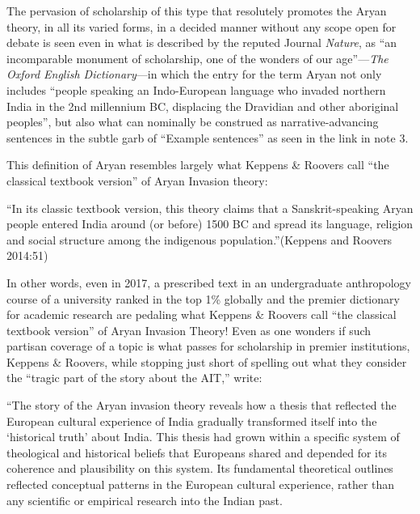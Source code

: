The pervasion of scholarship of this type that resolutely promotes the Aryan theory, in all its varied forms, in a decided manner without any scope open for debate is seen even in what is described by the reputed Journal \textit{Nature}, as “an incomparable monument of scholarship, one of the wonders of our age”—\textit{The Oxford English Dictionary}—in which the entry for the term Aryan not only includes “people speaking an Indo-European language who invaded northern India in the 2nd millennium BC, displacing the Dravidian and other aboriginal peoples”, but also what can nominally be construed as narrative-advancing sentences in the subtle garb of “Example sentences” as seen in the link in note 3.

This definition of Aryan resembles largely what Keppens \& Roovers call “the classical textbook version” of Aryan Invasion theory:

\begin{myquote}
“In its classic textbook version, this theory claims that a Sanskrit-speaking Aryan people entered India around (or before) 1500 BC and spread its language, religion and social structure among the indigenous population.”\hfill (Keppens and Roovers 2014:51)
\end{myquote}

In other words, even in 2017, a prescribed text in an undergraduate anthropology course of a university ranked in the top 1\% globally and the premier dictionary for academic research are pedaling what Keppens \& Roovers call “the classical textbook version” of Aryan Invasion Theory! Even as one wonders if such partisan coverage of a topic is what passes for scholarship in premier institutions, Keppens \& Roovers, while stopping just short of spelling out what they consider the “tragic part of the story about the AIT,” write:

\begin{myquote}
“The story of the Aryan invasion theory reveals how a thesis that reflected the European cultural experience of India gradually transformed itself into the ‘historical truth’ about India. This thesis had grown within a specific system of theological and historical beliefs that Europeans shared and depended for its coherence and plausibility on this system. Its fundamental theoretical outlines reflected conceptual patterns in the European cultural experience, rather than any scientific or empirical research into the Indian past.
\end{myquote}

